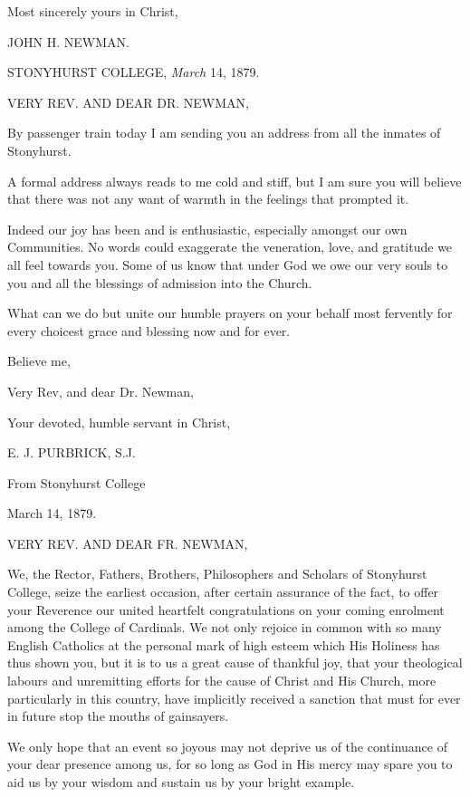 Most sincerely yours in Christ,

JOHN H. NEWMAN.


STONYHURST COLLEGE, \emph{March}
14, 1879.

VERY REV. AND
DEAR DR. NEWMAN,

By passenger train today I am sending you an address from all the
inmates of Stonyhurst.

A formal address always reads to me cold and stiff, but I am sure
you will believe that there was not any want of warmth in the feelings
that prompted it.

Indeed our joy has been and is enthusiastic, especially amongst our
own Communities. No words could exaggerate the veneration, love, and
gratitude we all feel towards you. Some of us know that under God we
owe our very souls to you and all the blessings of admission into the
Church.

What can we do but unite our humble prayers on your behalf most
fervently for every choicest grace and blessing now and for ever.

Believe me,

Very Rev, and dear Dr. Newman,

Your devoted, humble servant in Christ,

E. J. PURBRICK, S.J.

From Stonyhurst College

March 14, 1879.

VERY REV. AND
DEAR FR. NEWMAN,

We, the Rector, Fathers, Brothers, Philosophers and Scholars of
Stonyhurst College, seize the earliest occasion, after certain
assurance of the fact, to offer your Reverence our united heartfelt congratulations on your coming enrolment among the College
of Cardinals. We not only rejoice in common with so many English
Catholics at the personal mark of high esteem which His Holiness has
thus shown you, but it is to us a great cause of thankful joy, that
your theological labours and unremitting efforts for the cause of
Christ and His Church, more particularly in this country, have
implicitly received a sanction that must for ever in future stop the
mouths of gainsayers.

We only hope that an event so joyous may not deprive us of the
continuance of your dear presence among us, for so long as God in His
mercy may spare you to aid us by your wisdom and sustain us by your
bright example.

